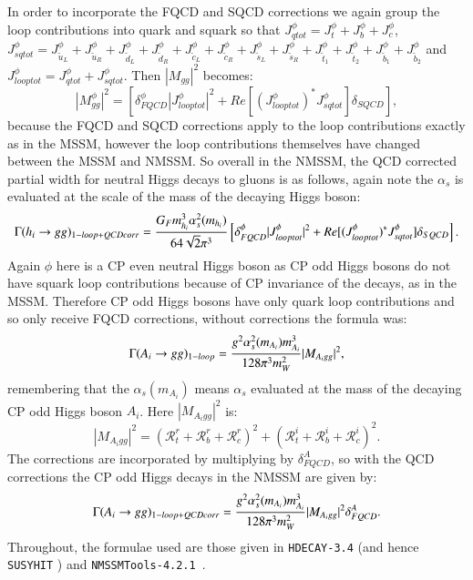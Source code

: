 \documentclass[final,3p,times,pdflatex]{elsarticle}
\begin{document}
In order to incorporate the FQCD and SQCD corrections we again group the loop contributions into quark and squark so that $J_{qtot}^\phi = J_{t}^\phi + J_{b}^\phi + J_{c}^\phi$, $J_{sqtot}^\phi = J_{\tilde{u}_L}^\phi + J_{\tilde{u}_R}^\phi + J_{\tilde{d}_L}^\phi + J_{\tilde{d}_R}^\phi + J_{\tilde{c}_L}^\phi + J_{\tilde{c}_R}^\phi + J_{\tilde{s}_L}^\phi + J_{\tilde{s}_R}^\phi + J_{\tilde{t}_1}^\phi + J_{\tilde{t}_2}^\phi + J_{\tilde{b}_1}^\phi + J_{\tilde{b}_2}^\phi$ and $J_{looptot}^\phi = J_{qtot}^\phi + J_{sqtot}^\phi$.
Then $|M_{gg}|^2$ becomes:
\begin{equation}
|M_{gg}^\phi|^2 = \left[\delta_{FQCD}^\phi|J_{looptot}^\phi|^2 + Re[({J_{looptot}^\phi})^* J_{sqtot}^\phi]\delta_{SQCD}\right],
\end{equation}
because the FQCD and SQCD corrections apply to the loop contributions exactly as in the MSSM, however the loop contributions themselves have changed between the MSSM and NMSSM\@.
So overall in the NMSSM, the QCD corrected partial width for neutral Higgs decays to gluons is as follows, again note the $\alpha_s$ is evaluated at the scale of the mass of the decaying Higgs boson:
\begin{equation} \label{hggQCDcorrNMSSM}
\Gamma(h_{i} \rightarrow gg)_{1-loop + QCDcorr} = {G_{F} m_{h_i}^3 \alpha_{s}^2 (m_{h_i}) \over 64 \sqrt{2} \pi^3} \left[\delta_{FQCD}^\phi|J_{looptot}^\phi|^2 + Re[({J_{looptot}^\phi})^* J_{sqtot}^\phi]\delta_{SQCD}\right].
\end{equation}	
Again $\phi$ here is a CP even neutral Higgs boson as CP odd Higgs bosons do not have squark loop contributions because of CP invariance of the decays, as in the MSSM\@. Therefore CP odd Higgs bosons have only quark loop contributions and so only receive FQCD corrections, without corrections the formula was:
\begin{equation} \label{AggnormNMSSM}
\Gamma(A_i \rightarrow g g)_{1-loop} = {g^2 \alpha_s^2 (m_{A_i}) m_{A_i}^3 \over 128 \pi^3 m_{W}^2} |M_{A_i gg}|^2,
\end{equation}
remembering that the $\alpha_s (m_{A_i})$ means $\alpha_s$ evaluated at the mass of the decaying CP odd Higgs boson $A_i$. Here $|M_{A_i gg}|^2$ is:
\begin{equation}
|M_{A_i gg}|^2 = (\mathcal{R}_{t}^{r} + \mathcal{R}_{b}^{r} + \mathcal{R}_{c}^{r})^2 + (\mathcal{R}_{t}^{i} + \mathcal{R}_{b}^{i} + \mathcal{R}_{c}^{i})^2.
\end{equation}
The corrections are incorporated by multiplying by $\delta_{FQCD}^A$, so with the QCD corrections the CP odd Higgs decays in the NMSSM are given by:
\begin{equation} \label{AggQCDcorrNMSSM}
\Gamma(A_i \rightarrow g g)_{1-loop + QCDcorr} = {g^2 \alpha_s^2 (m_{A_i}) m_{A_i}^3 \over 128 \pi^3 m_{W}^2} |M_{A_i gg}|^2 \delta_{FQCD}^A.
\end{equation}
Throughout, the formulae used are those given in {\tt HDECAY-3.4} \cite{Djouadi:1997yw} (and hence {\tt SUSYHIT} \cite{Djouadi:2006bz}) and {\tt NMSSMTools-4.2.1}~\citep{Allanach:2001kg,Ellwanger:2012dd,Ellwanger:2006ch}.


%

\end{document}
